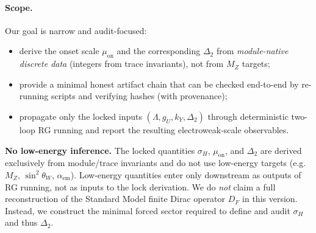 \documentclass[11pt]{article}
\begin{document}
\paragraph{Scope.}
Our goal is narrow and audit-focused:
\begin{itemize}
  \item derive the onset scale $\mu_{\mathrm{on}}$ and the corresponding $\Delta_2$ from \emph{module-native discrete data} (integers from trace invariants), not from $M_Z$ targets;
  \item provide a minimal honest artifact chain that can be checked end-to-end by re-running scripts and verifying hashes (with provenance);
  \item propagate only the locked inputs $(\Lambda,g_U,k_Y,\Delta_2)$ through deterministic two-loop RG running and report the resulting electroweak-scale observables.
\end{itemize}
\noindent\textbf{No low-energy inference.}
The locked quantities $\sigma_H$, $\mu_{\mathrm{on}}$, and $\Delta_2$ are derived exclusively from module/trace invariants and do not use low-energy targets (e.g.\ $M_Z$, $\sin^2\theta_W$, $\alpha_{\mathrm{em}}$). Low-energy quantities enter only downstream as outputs of RG running, not as inputs to the lock derivation.
We do \emph{not} claim a full reconstruction of the Standard Model finite Dirac operator $D_F$ in this version. Instead, we construct the minimal forced sector required to define and audit $\sigma_H$ and thus $\Delta_2$.
\end{document}
